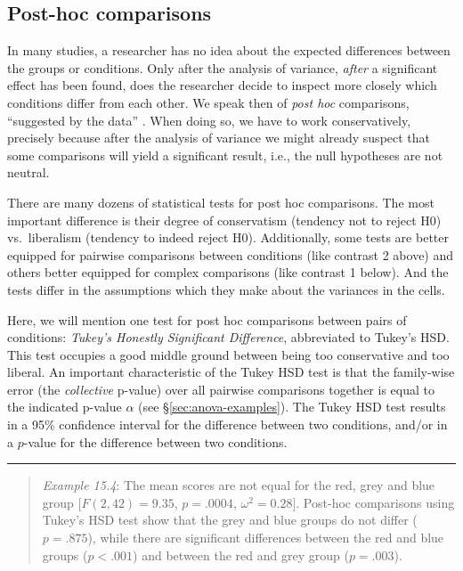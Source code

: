 \documentclass[
]{book}
\begin{document}
\hypertarget{sec:anova-oneway-posthoc}{%
\subsection{Post-hoc comparisons}\label{sec:anova-oneway-posthoc}}

In many studies, a researcher has no idea about the expected differences
between the groups or conditions. Only after the analysis of variance,
\emph{after} a significant effect has been found, does the researcher decide
to inspect more closely which conditions differ from each other. We speak
then of \emph{post hoc} comparisons, ``suggested by the data'' \citep[ p.200]{MD04}.
When doing so, we have to work conservatively, precisely because
after the analysis of variance we might already suspect that some
comparisons will yield a significant result,
i.e., the null hypotheses are not neutral.

There are many dozens of statistical tests for post hoc
comparisons. The most important difference is their degree of conservatism
(tendency not to reject H0) vs.~liberalism (tendency to indeed reject H0).
Additionally, some tests are better equipped
for pairwise comparisons between conditions (like contrast 2 above) and
others better equipped for complex comparisons
(like contrast 1 below). And the tests differ in the assumptions
which they make about the variances in the cells.

Here, we will mention one test
for post hoc comparisons between pairs of conditions: \emph{Tukey's
Honestly Significant Difference}, abbreviated to Tukey's HSD. This test
occupies a good middle ground between being too conservative and too liberal. An
important characteristic of the Tukey HSD test is that the family-wise
error (the \emph{collective} p-value) over all pairwise comparisons together
is equal to the indicated p-value
\(\alpha\) (see §\ref{sec:anova-examples}). The Tukey HSD test results in
a 95\% confidence interval for the difference between two conditions,
and/or in a \(p\)-value for the difference between two conditions.

\begin{center}\rule{0.5\linewidth}{0.5pt}\end{center}

\begin{quote}
\emph{Example 15.4}:
The mean scores are not equal for the red, grey and blue group
\([F(2,42) = 9.35\), \(p = .0004\), \(\omega^2 = 0.28]\).
Post-hoc comparisons using Tukey's HSD test show that the grey and blue groups do not differ (\(p=.875\)), while there are significant differences between the red and blue groups (\(p<.001\)) and between the red and grey group (\(p=.003\)).
\end{quote}
\end{document}
